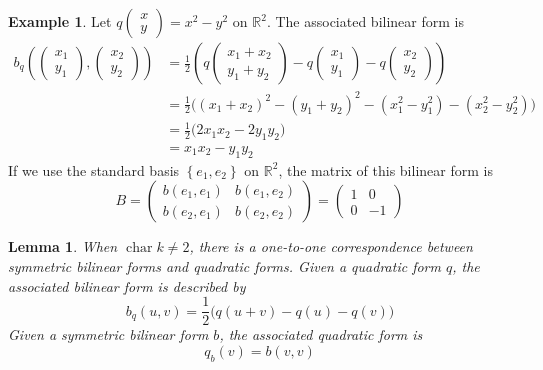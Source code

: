 \documentclass[12pt]{article}
\newtheorem{lemma}[theorem]{Lemma}
\theoremstyle{definition}
\newtheorem{example}[theorem]{Example}
\newcommand{\R}{\mathbb{R}}
\newcommand{\lp}{\left(}
\newcommand{\rp}{\right)}
\newcommand{\lb}{\left\{}
\newcommand{\rb}{\right\}}
\DeclareMathOperator{\characteristic}{char}
\begin{document}
\begin{example}
Let $q \begin{pmatrix} x \\ y \end{pmatrix} = x^2 - y^2$ on $\R^2$. The associated bilinear form is
\begin{align*}
	b_q \lp
	\begin{pmatrix}
		x_1 \\
		y_1
	\end{pmatrix}
	,
	\begin{pmatrix}
		x_2 \\
		y_2
	\end{pmatrix}
	\rp &= \frac 12 \lp
	q 
	\begin{pmatrix}
		x_1 + x_2 \\
		y_1 + y_2
	\end{pmatrix}
	-
	q 
	\begin{pmatrix}
		x_1 \\
		y_1
	\end{pmatrix}
	-
	q 
	\begin{pmatrix}
		x_2 \\
		y_2
	\end{pmatrix}
	\rp \\
	&= \frac 12 \Big( (x_1 + x_2)^2 - (y_1 + y_2)^2 - (x_1^2 - y_1^2) - (x_2^2 - y_2^2)  \Big) \\
	&= \frac 12 \Big( 2x_1 x_2  - 2y_1 y_2 \Big) \\
	&= x_1 x_2 - y_1 y_2
\end{align*}
If we use the standard basis $\lb e_1, e_2 \rb$ on $\R^2$, the matrix of this bilinear form is
\[
	B =
	\begin{pmatrix}
		b(e_1, e_1) & b(e_1, e_2) \\
		b(e_2, e_1) & b(e_2, e_2) 
	\end{pmatrix}
	=
	\begin{pmatrix}
		1 & 0 \\
		0 & -1
	\end{pmatrix}
\]
\end{example}

\begin{lemma}
When $\characteristic k \neq 2$, there is a one-to-one correspondence between symmetric bilinear forms and quadratic forms. Given a quadratic form $q$, the associated bilinear form is described by
\[
	b_q(u,v) = \frac 12 \Big( q(u+v) - q(u) - q(v) \Big)
\]
Given a symmetric bilinear form $b$, the associated quadratic form is
\[
	q_b(v) = b(v,v)
\]
\end{lemma}
\end{document}
